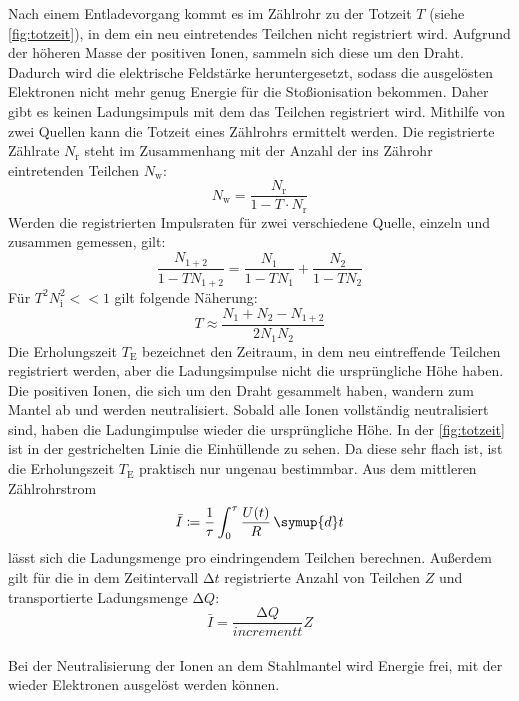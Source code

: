 Nach einem Entladevorgang kommt es im Zählrohr zu der Totzeit $T$ (siehe \autoref{fig:totzeit}), in dem ein neu eintretendes Teilchen nicht registriert wird.
Aufgrund der höheren Masse der positiven Ionen, sammeln sich diese um den Draht.
Dadurch wird die elektrische Feldstärke heruntergesetzt, sodass die ausgelösten Elektronen nicht mehr genug Energie für die Stoßionisation bekommen.
Daher gibt es keinen Ladungsimpuls mit dem das Teilchen registriert wird.
Mithilfe von zwei Quellen kann die Totzeit eines Zählrohrs ermittelt werden. 
Die registrierte Zählrate $N_{\text{r}}$ steht im Zusammenhang mit der Anzahl der ins Zährohr eintretenden Teilchen $N_{\text{w}}$:
\begin{equation*}
    N_{\text{w}} = \frac{N_{\text{r}}}{1-T\cdot N_{\text{r}}}
\end{equation*}
Werden die registrierten Impulsraten für zwei verschiedene Quelle, einzeln und zusammen gemessen, gilt:
\begin{equation*}
    \frac{N_{1+2}}{1-TN_{1+2}} = \frac{N_1}{1-TN_1}+\frac{N_2}{1-TN_2}
\end{equation*}
Für $T^2N_{\text{i}}^2 <<1$ gilt folgende Näherung:
\begin{equation}\label{eqn:totzeit}
    T \approx \frac{N_1 + N_2 - N_{1+2}}{2N_1N_2}
\end{equation}
Die Erholungszeit $T_{\text{E}}$ bezeichnet den Zeitraum, in dem neu eintreffende Teilchen registriert werden, aber die Ladungsimpulse nicht die ursprüngliche Höhe haben.
Die positiven Ionen, die sich um den Draht gesammelt haben, wandern zum Mantel ab und werden neutralisiert.
Sobald alle Ionen vollständig neutralisiert sind, haben die Ladungimpulse wieder die ursprüngliche Höhe.
In der \autoref{fig:totzeit} ist in der gestrichelten Linie die Einhüllende zu sehen.
Da diese sehr flach ist, ist die Erholungszeit $T_{\text{E}}$ praktisch nur ungenau bestimmbar.
Aus dem mittleren Zählrohrstrom 
 \begin{equation*}
     \bar{I} \coloneq \frac{1}{\tau} \int_0^{\tau} \frac{U(t)}{R}\,\symup{d}t
 \end{equation*} 
 lässt sich die Ladungsmenge pro eindringendem Teilchen berechnen.
 Außerdem gilt für die in dem Zeitintervall $\increment t$ registrierte Anzahl von Teilchen $Z$ und transportierte Ladungsmenge $\increment Q$:
 \begin{equation*}
     \bar{I} = \frac{\increment Q}{increment t} Z
 \end{equation*}\\
Bei der Neutralisierung der Ionen an dem Stahlmantel wird Energie frei, mit der wieder Elektronen ausgelöst werden können.

